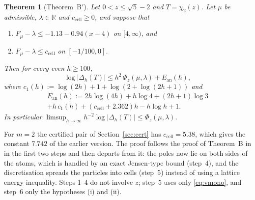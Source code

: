 \documentclass[11pt]{amsart}
\newtheorem{theorem}{Theorem}[section]
\theoremstyle{definition}
\theoremstyle{remark}
\numberwithin{equation}{section}
\newcommand{\RR}{\mathbb{R}}
\newcommand{\ccell}{c_{\mathrm{cell}}}
\begin{document}
\begin{theorem}[Theorem~B$'$]\label{thm:B}
Let $0<z\le\sqrt5-2$ and $T=\chi_2(z)$. Let $\mu$ be admissible, $\lambda\in\RR$ and $\ccell\ge0$, and suppose that
\begin{enumerate}
\item[(i)] $F_\mu-\lambda\le-1.13-0.94(x-4)$ on $[4,\infty)$, and
\item[(ii)] $F_\mu-\lambda\le\ccell$ on $[-1/100,0]$.
\end{enumerate}
Then for every even $h\ge100$,
\[
  \log|\Delta_h(T)|\le h^2\,\Phi_z(\mu,\lambda)+E_{\mathrm{an}}(h),
\]
where $c_1(h):=\log(2h)+1+\log(2+\log(2h+1))$ and
\begin{multline*}
  E_{\mathrm{an}}(h):=2h\log(4h)+h\log4+(2h+1)\log3\\
  +h\,c_1(h)+(\ccell+2.362)h-h\log h+1 .
\end{multline*}
In particular $\limsup_{h\to\infty}h^{-2}\log|\Delta_h(T)|\le\Phi_z(\mu,\lambda)$.
\end{theorem}

For $m=2$ the certified pair of Section~\ref{sec:cert} has $\ccell=5.38$, which gives the constant $7.742$ of the earlier
version. The proof follows the proof of Theorem~B in \cite{Chi2Paper} in the first two steps and then departs from it: the
poles now lie on both sides of the atoms, which is handled by an exact Jensen-type bound (step~4), and the discretisation
spreads the particles into cells (step~5) instead of using a lattice energy inequality. Steps 1--4 do not involve $z$;
step~5 uses only \eqref{eq:vmono}, and step~6 only the hypotheses (i) and (ii).
\end{document}
